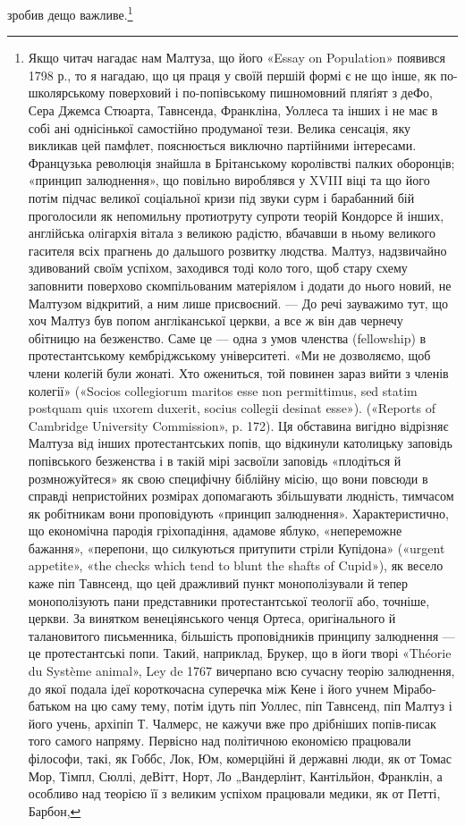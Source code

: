 зробив дещо важливе.\footnote{
Якщо читач нагадає нам Малтуза, що його «Essay on Population»
появився 1798 р., то я нагадаю, що ця праця у своїй першій формі є не
що інше, як по-школярському поверховий і по-попівському пишномовний
пляґіят з деФо, Сера Джемса Стюарта, Тавнсенда, Франкліна, Уоллеса
та інших і не має в собі ані однісінької самостійно продуманої тези. Велика
сенсація, яку викликав цей памфлет, пояснюється виключно партійними
інтересами. Французька революція знайшла в Брітанському королівстві
палких оборонців; «принцип залюднення», що повільно вироблявся у
XVIII віці та що його потім підчас великої соціальної кризи під звуки
сурм і барабанний бій проголосили як непомильну протиотруту супроти
теорій Кондорсе й інших, англійська олігархія вітала з великою радістю,
вбачавши в ньому великого гасителя всіх прагнень до дальшого розвитку
людства. Малтуз, надзвичайно здивований своїм успіхом, заходився тоді
коло того, щоб стару схему заповнити поверхово скомпільованим матеріялом
і додати до нього новий, не Малтузом відкритий, а ним лише
присвоєний. — До речі зауважимо тут, що хоч Малтуз був попом англіканської
церкви, а все ж він дав чернечу обітницю на безженство.
Саме це — одна з умов членства (fellowship) в протестантському кембріджському
університеті. «Ми не дозволяємо, щоб члени колегій були
жонаті. Хто ожениться, той повинен зараз вийти з членів колегії» («Socios
collegiorum maritos esse non permittimus, sed statim postquam quis
uxorem duxerit, socius collegii desinat esse»). («Reports of Cambridge University
Commission», p. 172). Ця обставина вигідно відрізняє Малтуза
від інших протестантських попів, що відкинули католицьку заповідь
попівського безженства і в такій мірі засвоїли заповідь «плодіться й
розмножуйтеся» як свою специфічну біблійну місію, що вони повсюди
в справді непристойних розмірах допомагають збільшувати людність,
тимчасом як робітникам вони проповідують «принцип залюднення».
Характеристично, що економічна пародія гріхопадіння, адамове яблуко,
«непереможне бажання», «перепони, що силкуються притупити стріли
Купідона» («urgent appetite», «the checks which tend to blunt the shafts
of Cupid»), як весело каже піп Тавнсенд, що цей дражливий пункт монополізували
й тепер монополізують пани представники протестантської
теології або, точніше, церкви. За винятком венеціянського ченця Ортеса,
оригінального й талановитого письменника, більшість проповідників
принципу залюднення — це протестантські попи. Такий, наприклад,
Брукер, що в йоги творі «Théorie du Système animal», Ley de 1767 вичерпано
всю сучасну теорію залюднення, до якої подала ідеї короткочасна
суперечка між Кене і його учнем Мірабо-батьком на цю саму тему,
потім ідуть піп Уоллес, піп Тавнсенд, піп Малтуз і його учень, архіпіп
Т. Чалмерс, не кажучи вже про дрібніших попів-писак того самого напряму.
Первісно над політичною економією працювали філософи, такі,
як Гоббс, Лок, Юм, комерційні й державні люди, як от Томас Мор, Тімпл,
Сюллі, деВітт, Норт, Ло „Вандерлінт, Кантільйон, Франклін, а особливо
над теорією її з великим успіхом працювали медики, як от Петті, Барбон,
}

